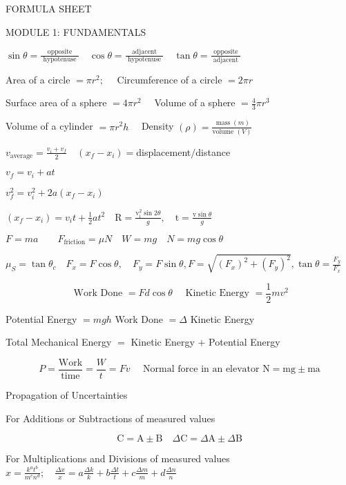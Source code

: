 \documentclass{extarticle}
\begin{document}
\begin{tcolorbox}[enhanced jigsaw,sharp corners,coltext=black,colback=BurntOrange!25!white,boxrule=pt,breakable,size=minimal]


FORMULA SHEET

MODULE 1: FUNDAMENTALS

$\sin \theta=\frac{\text { opposite }}{\text { hypotenuse }} \quad \cos \theta=\frac{\text { adjacent }}{\text { hypotenuse }} \quad \tan \theta=\frac{\text { opposite }}{\text { adjacent }}$

Area of a circle $=\pi r^{2} ; \quad$ Circumference of a circle $=2 \pi r$

Surface area of a sphere $=4 \pi r^{2} \quad$ Volume of a sphere $=\frac{4}{3} \pi r^{3}$

Volume of a cylinder $=\pi r^{2} h \quad$ Density $(\rho)=\frac{\operatorname{mass}(m)}{\text {volume }(V)}$

$v_{\text {average}}=\frac{v_{i}+v_{f}}{2} \quad\left(x_{f}-x_{i}\right)=$displacement$/$distance

$v_{f}=v_{i}+a t$

$v_{f}^{2}=v_{i}^{2}+2 a\left(x_{f}-x_{i}\right)$

$\left(x_{f}-x_{i}\right)=v_{i} t+\frac{1}{2} a t^{2} \quad \mathrm{R}=\frac{\mathrm{v}_{\mathrm{i}}^{2} \sin 2 \theta}{g}, \quad \mathrm{t}=\frac{\mathrm{v} \sin \theta}{g}$

$F=m a \quad \quad F_{\text {friction}}=\mu N \quad W=m g \quad N=m g \cos \theta$

$\mu_{S}=\tan \theta_{c} \quad F_{x}=F \cos \theta, \quad F_{y}=F \sin \theta, F=\sqrt{\left(F_{x}\right)^{2}+\left(F_{y}\right)^{2}}, \tan \theta=\frac{F_{y}}{F_{x}}$

\[
\text { Work Done }=F d \cos \theta \quad \text { Kinetic Energy }=\frac{1}{2} m v^{2}
\]

Potential Energy $=m g h$ Work Done $=\Delta$ Kinetic Energy

Total Mechanical Energy $=$ Kinetic Energy $+$ Potential Energy

\[
P=\frac{\text {Work}}{\text {time}}=\frac{W}{t}=F v \quad \text { Normal force in an elevator } \mathrm{N}=\mathrm{mg} \pm \mathrm{ma}
\]

Propagation of Uncertainties 

For Additions or Subtractions of measured values

\[
\mathrm{C}=\mathrm{A} \pm \mathrm{B} \quad \Delta \mathrm{C}=\Delta \mathrm{A} \pm \Delta \mathrm{B}
\]


For Multiplications and Divisions of measured values $x=\frac{k^{a} t^{b}}{m^{c} n^{d}} ; \quad \frac{\Delta x}{x}=a \frac{\Delta k}{k}+b \frac{\Delta t}{t}+c \frac{\Delta m}{m}+d \frac{\Delta n}{n}$


\end{tcolorbox}
\end{document}
